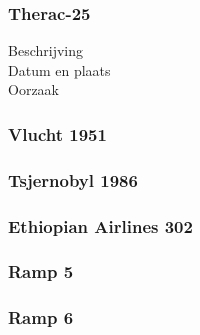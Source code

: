 \documentclass{article}%
\begin{document}
\subsubsection{Therac-25}
\begin{description}
\item[Beschrijving]
\item[Datum en plaats] 
\item[Oorzaak]
\end{description}

\subsubsection{Vlucht 1951}

\subsubsection{Tsjernobyl 1986}

\subsubsection{Ethiopian Airlines 302}

\subsubsection{Ramp 5}
\subsubsection{Ramp 6}

\clearpage
\end{document}
